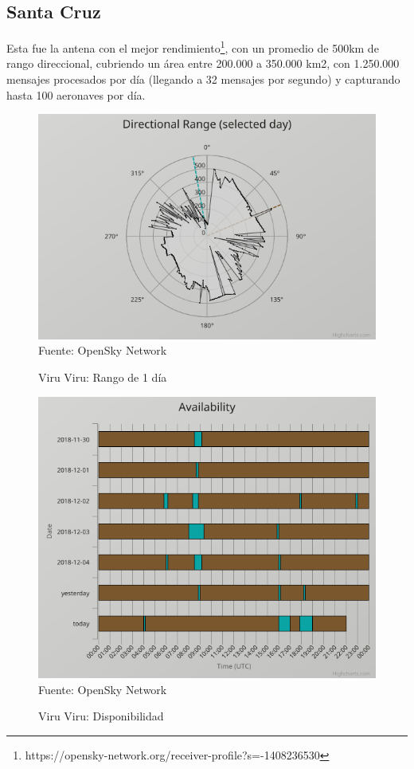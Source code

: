 \documentclass[fleqn,10pt]{SelfArx} %
\begin{document}
\subsection*{Santa Cruz}

Esta fue la antena con el mejor rendimiento\footnote{https://opensky-network.org/receiver-profile?s=-1408236530}, con un promedio de 500km de rango direccional, cubriendo un área entre 200.000 a 350.000 km2, con 1.250.000 mensajes procesados por día (llegando a 32 mensajes por segundo) y capturando hasta 100 aeronaves por día.

\begin{figure}[ht]
\caption{Viru Viru: Rango de 1 día}
\centering
\includegraphics[width=0.8\linewidth]{vvi_range.png}
\newline Fuente: OpenSky Network
\label{fig:vvi_range}
\end{figure}

\begin{figure}[ht]
\caption{Viru Viru: Disponibilidad}
\centering
\includegraphics[width=0.8\linewidth]{vvi_disp.png}
\newline Fuente: OpenSky Network
\label{fig:vvi_disp}
\end{figure}
\end{document}

